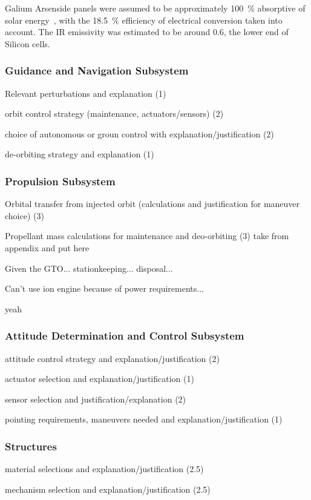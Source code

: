 \documentclass[9pt]{article}
\begin{document}
Galium Arsenside panels were assumed to be approximately \qty{100}{\percent} absorptive of solar energy~\cite{gaas}, with the \qty{18.5}{\percent} efficiency of electrical conversion taken into account.
The IR emissivity was estimated to be around 0.6, the lower end of Silicon cells.

\subsubsection{Guidance and Navigation Subsystem}\label{sys:nav}
Relevant perturbations and explanation (1)

orbit control strategy (maintenance, actuators/sensors) (2)

choice of autonomous or groun control with explanation/justification (2)

de-orbiting strategy and explanation (1)

\subsubsection{Propulsion Subsystem}\label{sys:prop}
Orbital transfer from injected orbit (calculations and justification for maneuver choice) (3)

Propellant mass calculations for maintenance and deo-orbiting (3) take from appendix and put here

Given the GTO... stationkeeping... disposal...

Can't use ion engine because of power requirements...\cite{next}

yeah
\subsubsection{Attitude Determination and Control Subsystem}\label{sys:adcs}
attitude control strategy and explanation/justification (2)

actuator selection and explanation/justification (1)

sensor selection and justification/explanation (2)

pointing requirements, maneuvers needed and explanation/justification (1)

\subsubsection{Structures}\label{sys:struct}
material selections and explanation/justification (2.5)

mechanism selection and explanation/justification (2.5)
\end{document}
